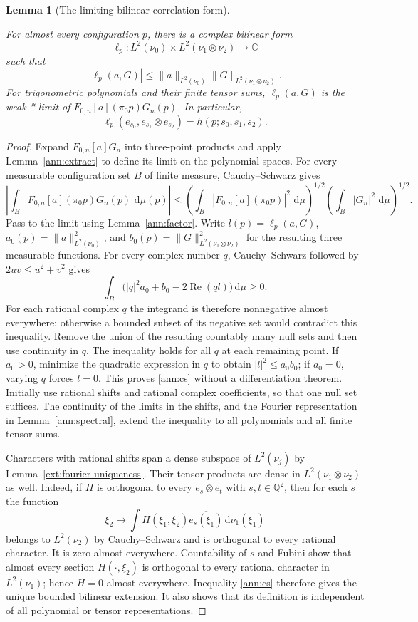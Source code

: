 \documentclass[11pt]{amsart}
\newcommand{\C}{\mathbb C}
\newcommand{\Q}{\mathbb Q}
\newcommand{\dd}{\,\mathrm d}
\newtheorem{lemma}[theorem]{Lemma}
\theoremstyle{definition}
\theoremstyle{remark}
\numberwithin{equation}{section}
\providecommand{\lean}[1]{}
\providecommand{\leanok}{}
\begin{document}
\begin{lemma}[The limiting bilinear correlation form]\label{ann:form}
\lean{Auto.ann_form}
\leanok
For almost every configuration $p$, there is a complex bilinear form
\[
 \ell_p:L^2(\nu_0)\times L^2(\nu_1\otimes\nu_2)\longrightarrow\C
\]
such that
\begin{equation}\label{ann:cs}
 |\ell_p(a,G)|\le
 \|a\|_{L^2(\nu_0)}\|G\|_{L^2(\nu_1\otimes\nu_2)}.
\end{equation}
For trigonometric polynomials and their finite tensor sums,
$\ell_p(a,G)$ is the weak-* limit of
$F_{0,n}[a](\pi_0p)G_n(p)$. In particular,
\[
 \ell_p(e_{s_0},e_{s_1}\otimes e_{s_2})
 =h(p;s_0,s_1,s_2).
\]
\end{lemma}
\begin{proof}
Expand $F_{0,n}[a]G_n$ into three-point products and apply
Lemma~\ref{ann:extract} to define its limit on the polynomial
spaces. For every measurable configuration set $B$ of finite measure,
Cauchy--Schwarz gives
\[
 \left|\int_B F_{0,n}[a](\pi_0p)G_n(p)\,\dd\mu(p)\right|
 \le
 \left(\int_B |F_{0,n}[a](\pi_0p)|^2\,\dd\mu\right)^{1/2}
 \left(\int_B |G_n|^2\,\dd\mu\right)^{1/2}.
\]
Pass to the limit using Lemma~\ref{ann:factor}.  Write
$l(p)=\ell_p(a,G)$, $a_0(p)=\|a\|_{L^2(\nu_0)}^2$, and
$b_0(p)=\|G\|_{L^2(\nu_1\otimes\nu_2)}^2$ for the resulting
three measurable functions.  For every complex number $q$,
Cauchy--Schwarz followed by $2uv\le u^2+v^2$ gives
\[
 \int_B\bigl(|q|^2a_0+b_0-2\operatorname{Re}(ql)\bigr)\dd\mu
 \ge0.
\]
For each rational complex $q$ the integrand is therefore nonnegative
almost everywhere: otherwise a bounded subset of its negative set
would contradict this inequality.  Remove the union of the resulting
countably many null sets and then use continuity in $q$.
The inequality holds for all $q$ at each remaining point.
If $a_0>0$, minimize the quadratic expression in $q$ to obtain
$|l|^2\le a_0b_0$; if $a_0=0$, varying $q$ forces $l=0$.
This proves \eqref{ann:cs} without a differentiation theorem.
Initially use rational shifts and rational complex coefficients,
so that one null set suffices.
The continuity of the limits in the shifts, and the Fourier
representation in Lemma~\ref{ann:spectral}, extend the inequality
to all polynomials and all finite tensor sums.

Characters with rational shifts span a dense subspace of
$L^2(\nu_j)$ by Lemma~\ref{ext:fourier-uniqueness}.
Their tensor products are dense in $L^2(\nu_1\otimes\nu_2)$ as well.
Indeed, if $H$ is orthogonal to every $e_s\otimes e_t$ with
$s,t\in\Q^2$, then for each $s$ the function
\[
 \xi_2\longmapsto\int H(\xi_1,\xi_2)
                       \overline{e_s(\xi_1)}\dd\nu_1(\xi_1)
\]
belongs to $L^2(\nu_2)$ by Cauchy--Schwarz and is orthogonal to
every rational character.  It is zero almost everywhere.  Countability
of $s$ and Fubini show that almost every section $H(\cdot,\xi_2)$
is orthogonal to every rational character in $L^2(\nu_1)$; hence
$H=0$ almost everywhere.  Inequality
\eqref{ann:cs} therefore gives the unique bounded bilinear
extension. It also shows that its definition is independent of
all polynomial or tensor representations.
\end{proof}
\end{document}

